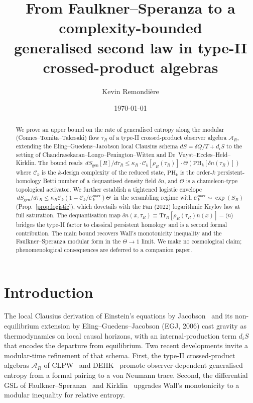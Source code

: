 \documentclass[aps,prd,superscriptaddress,nofootinbib,floatfix,10pt]{revtex4-2}
\theoremstyle{remark}
\newcommand{\Sgen}{S_{\mathrm{gen}}}
\newcommand{\tauR}{\tau_{R}}
\newcommand{\kR}{\kappa_{R}}
\newcommand{\Ck}{\mathcal{C}_{k}}
\newcommand{\PHk}{\mathrm{PH}_{k}}
\newcommand{\dn}{\delta n}
\newcommand{\AR}{\mathcal{A}_{R}}
\begin{document}
\title{From Faulkner--Speranza to a complexity-bounded\\
generalised second law in type-II crossed-product algebras}

\author{Kevin Remondi\`ere}

\date{\today}

\begin{abstract}
We prove an upper bound on the rate of generalised entropy along the
modular (Connes--Tomita--Takesaki) flow $\tauR$ of a type-II
crossed-product observer algebra $\AR$, extending the
Eling--Guedens--Jacobson local Clausius schema
$dS = \delta Q / T + d_{i} S$ to the setting of
Chandrasekaran--Longo--Penington--Witten and
De~Vuyst--Eccles--Held--Kirklin. The bound reads
$\, d\Sgen[R]/d\tauR \le \kR \cdot \Ck[\rho_{R}(\tauR)]
 \cdot \Theta(\PHk[\dn(\tauR)])\,$
where $\Ck$ is the $k$-design complexity of the reduced state,
$\PHk$ is the order-$k$ persistent-homology Betti number of a
dequantised density field $\dn$, and $\Theta$ is a chameleon-type
topological activator. We further establish a tightened logistic
envelope $\, d\Sgen/d\tauR \le \kR \Ck (1 - \Ck/\Ck^{\max})\Theta\,$
in the scrambling regime with
$\Ck^{\max}\sim\exp(S_{R})$ (Prop.~\ref{prop:logistic}), which
dovetails with the Fan (2022) logarithmic Krylov law at full
saturation. The dequantisation map
$\dn(x,\tauR) \equiv \mathrm{Tr}_{R}[\rho_{R}(\tauR)\hat n(x)] - \langle n\rangle$
bridges the type-II factor to classical persistent homology and is a
second formal contribution. The main bound recovers Wall's
monotonicity inequality and the Faulkner--Speranza modular form in
the $\Theta\to 1$ limit. We make no cosmological claim;
phenomenological consequences are deferred to a companion paper.
\end{abstract}

\maketitle

\section{Introduction}
\label{sec:intro}

The local Clausius derivation of Einstein's equations by
Jacobson~\cite{Jacobson1995} and its non-equilibrium extension by
Eling--Guedens--Jacobson (EGJ, 2006) cast gravity as thermodynamics on
local causal horizons, with an internal-production term
$d_{i}S$ that encodes the departure from equilibrium. Two recent
developments invite a modular-time refinement of that schema. First,
the type-II crossed-product algebras $\AR$ of
CLPW~\cite{CLPW2023} and
DEHK~\cite{DEHK2025a,DEHK2025b} promote observer-dependent generalised
entropy from a formal pairing to a von Neumann trace. Second, the
differential GSL of Faulkner--Speranza~\cite{FaulknerSperanza2024} and
Kirklin~\cite{Kirklin2025} upgrades Wall's monotonicity to a modular
inequality for relative entropy.
\end{document}

